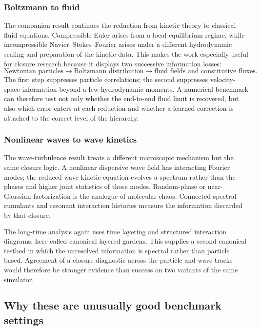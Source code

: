\documentclass[11pt]{article}
\begin{document}
\subsubsection{Boltzmann to fluid}

The companion result continues the reduction from kinetic theory to classical fluid equations. Compressible Euler arises from a local-equilibrium regime, while incompressible Navier--Stokes--Fourier arises under a different hydrodynamic scaling and preparation of the kinetic data. This makes the work especially useful for closure research because it displays two successive information losses:
\[
\text{Newtonian particles}
\longrightarrow
\text{Boltzmann distribution}
\longrightarrow
\text{fluid fields and constitutive fluxes}.
\]
The first step suppresses particle correlations; the second suppresses velocity-space information beyond a few hydrodynamic moments. A numerical benchmark can therefore test not only whether the end-to-end fluid limit is recovered, but also which error enters at each reduction and whether a learned correction is attached to the correct level of the hierarchy.

\subsubsection{Nonlinear waves to wave kinetics}

The wave-turbulence result treats a different microscopic mechanism but the same closure logic. A nonlinear dispersive wave field has interacting Fourier modes; the reduced wave kinetic equation evolves a spectrum rather than the phases and higher joint statistics of those modes. Random-phase or near-Gaussian factorization is the analogue of molecular chaos. Connected spectral cumulants and resonant interaction histories measure the information discarded by that closure.

The long-time analysis again uses time layering and structured interaction diagrams, here called canonical layered gardens. This supplies a second canonical testbed in which the unresolved information is spectral rather than particle based. Agreement of a closure diagnostic across the particle and wave tracks would therefore be stronger evidence than success on two variants of the same simulator.

\subsection{Why these are unusually good benchmark settings}
\end{document}
